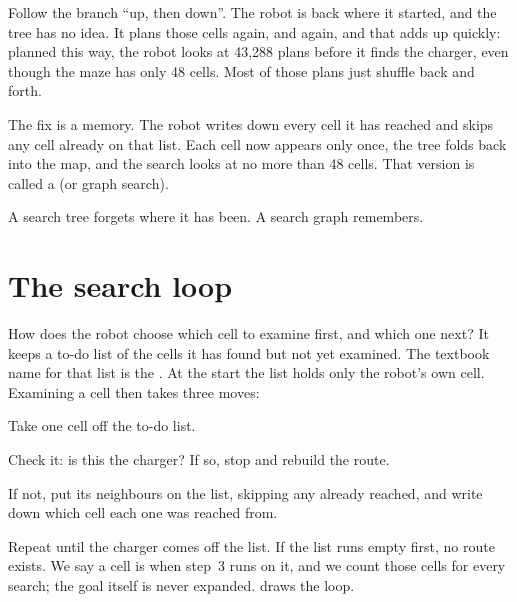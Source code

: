 Follow the branch ``up, then down''. The robot is back where it started, and the tree has no idea. It plans those cells again, and again, and that adds up quickly: planned this way, the robot looks at 43,288 plans before it finds the charger, even though the maze has only 48 cells. Most of those plans just shuffle back and forth.

The fix is a memory. The robot writes down every cell it has reached and skips any cell already on that list. Each cell now appears only once, the tree folds back into the map, and the search looks at no more than 48 cells. That version is called a  (or graph search).

\begin{keyidea}
A search tree forgets where it has been. A search graph remembers.
\end{keyidea}

\section{The search loop}

How does the robot choose which cell to examine first, and which one next? It keeps a to-do list of the cells it has found but not yet examined. The textbook name for that list is the . At the start the list holds only the robot's own cell. Examining a cell then takes three moves:

\begin{utpsteps}
  \item Take one cell off the to-do list.
  \item Check it: is this the charger? If so, stop and rebuild the route.
  \item If not, put its neighbours on the list, skipping any already reached, and write down which cell each one was reached from.
\end{utpsteps}

Repeat until the charger comes off the list. If the list runs empty first, no route exists. We say a cell is  when step~3 runs on it, and we count those cells for every search; the goal itself is never expanded.  draws the loop.

